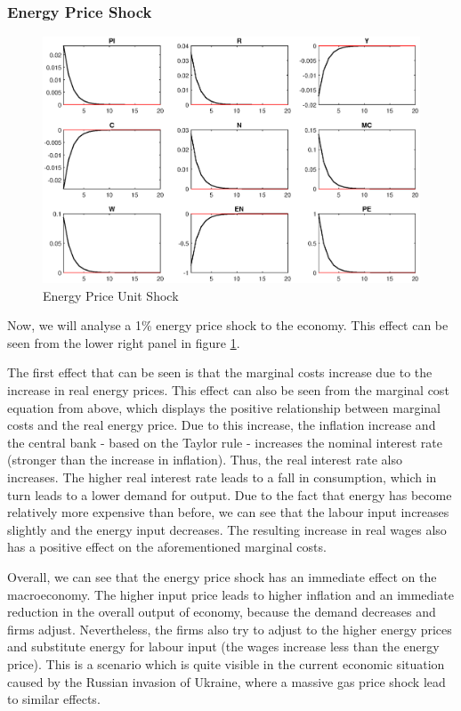 \documentclass[a4paper,11pt]{article}
\begin{document}
\subsubsection{Energy Price Shock}
\begin{figure}[H]
\centering
\includegraphics[scale=0.7]{figures/enpriceshock.eps}
\caption{Energy Price Unit Shock}
\label{fig:enpriceshock}
\end{figure}
Now, we will analyse a 1\% energy price shock to the economy. This effect can be seen from the lower right panel in figure \ref{fig:enpriceshock}. 

The first effect that can be seen is that the marginal costs increase due to the increase in real energy prices. This effect can also be seen from the marginal cost equation from above, which displays the positive relationship between marginal costs and the real energy price. Due to this increase, the inflation increase and the central bank - based on the Taylor rule - increases the nominal interest rate (stronger than the increase in inflation). Thus, the real interest rate also increases. The higher real interest rate leads to a fall in consumption, which in turn leads to a lower demand for output. Due to the fact that energy has become relatively more expensive than before, we can see that the labour input increases slightly and the energy input decreases. The resulting increase in real wages also has a positive effect on the aforementioned marginal costs. 

Overall, we can see that the energy price shock has an immediate effect on the macroeconomy. The higher input price leads to higher inflation and an immediate reduction in the overall output of economy, because the demand decreases and firms adjust. Nevertheless, the firms also try to adjust to the higher energy prices and substitute energy for labour input (the wages increase less than the energy price). This is a scenario which is quite visible in the current economic situation caused by the Russian invasion of Ukraine, where a massive gas price shock lead to similar effects.   
\end{document}
